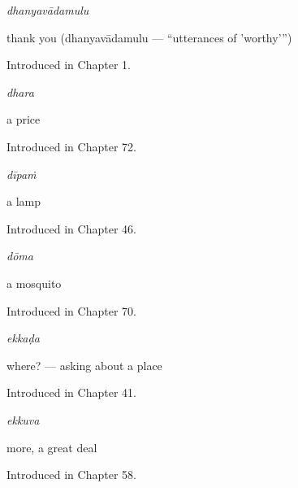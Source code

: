 \noindent\begin{minipage}[t]{\linewidth}
\raggedright
\textbf{}\enspace\emph{dhanyavādamulu}\par
\small thank you (dhanyavādamulu — \textquotedblleft{}utterances of 'worthy'\textquotedblright{})\par
\footnotesize Introduced in Chapter 1.
\end{minipage}\par\medskip

\noindent\begin{minipage}[t]{\linewidth}
\raggedright
\textbf{}\enspace\emph{dhara}\par
\small a price\par
\footnotesize Introduced in Chapter 72.
\end{minipage}\par\medskip

\noindent\begin{minipage}[t]{\linewidth}
\raggedright
\textbf{}\enspace\emph{dīpaṁ}\par
\small a lamp\par
\footnotesize Introduced in Chapter 46.
\end{minipage}\par\medskip

\noindent\begin{minipage}[t]{\linewidth}
\raggedright
\textbf{}\enspace\emph{dōma}\par
\small a mosquito\par
\footnotesize Introduced in Chapter 70.
\end{minipage}\par\medskip

\noindent\begin{minipage}[t]{\linewidth}
\raggedright
\textbf{}\enspace\emph{ekkaḍa}\par
\small where? — asking about a place\par
\footnotesize Introduced in Chapter 41.
\end{minipage}\par\medskip

\noindent\begin{minipage}[t]{\linewidth}
\raggedright
\textbf{}\enspace\emph{ekkuva}\par
\small more, a great deal\par
\footnotesize Introduced in Chapter 58.
\end{minipage}\par\medskip

